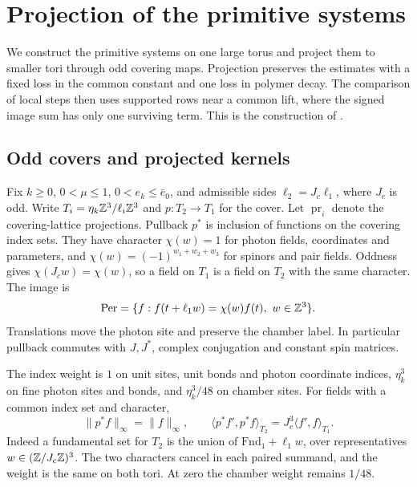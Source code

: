 \section{Projection of the primitive systems}\label{sec:rg-cover-comparison}

We construct the primitive systems on one large torus and
project them to smaller tori through odd covering maps. Projection preserves the
estimates with a fixed loss in the common constant and
one loss in polymer decay. The comparison of local steps
then uses supported rows near a common lift, where the
signed image sum has only one surviving term.
This is the construction of \cite[\S\S15.1--15.3]{QED3Master}.

\subsection{Odd covers and projected kernels}
\label{subsec:rgcov-projection}

Fix $k\ge0$, $0<\mu\le1$, $0<e_k\le\bar e_0$, and admissible
sides $\ell_2=J_c\ell_1$, where $J_c$ is odd.
Write $T_i=\eta_k\mathbb Z^3/\ell_i\mathbb Z^3$ and
$p:T_2\to T_1$ for the cover. Let
$\operatorname{pr}_i$ denote the covering-lattice projections.
Pullback $p^*$ is inclusion of functions on the covering
index sets. They have character
$\chi(w)=1$ for photon fields, coordinates and parameters,
and $\chi(w)=(-1)^{w_1+w_2+w_3}$ for spinors and pair
fields. Oddness gives
$\chi(J_cw)=\chi(w)$, so a field on $T_1$ is a field
on $T_2$ with the same character.
The image is
\[
 \mathrm{Per}=\{f:f(t+\ell_1w)=\chi(w)f(t),\ w\in\Z^3\}.
\]
Translations move the photon site and preserve the chamber
label. In particular pullback commutes with $J,J^*$,
complex conjugation and constant spin matrices.

The index weight is $1$ on unit sites, unit bonds and
photon coordinate indices, $\eta_k^3$ on fine photon
sites and bonds, and $\eta_k^3/48$ on chamber sites.
For fields with a common index set and character,
\begin{equation}\label{eq:rgcov-pullback-pairing}
 \|p^*f\|_\infty=\|f\|_\infty,\qquad
 \langle p^*f',p^*f\rangle_{T_2}
                                      =J_c^3\langle f',f\rangle_{T_1}.
\end{equation}
Indeed a fundamental set for $T_2$ is the union of
$\mathrm{Fnd}_1+\ell_1w$, over representatives
$w\in(\mathbb Z/J_c\mathbb Z)^3$. The two characters cancel in
each paired summand, and the weight is the same on both
tori. At zero the chamber weight remains $1/48$.


